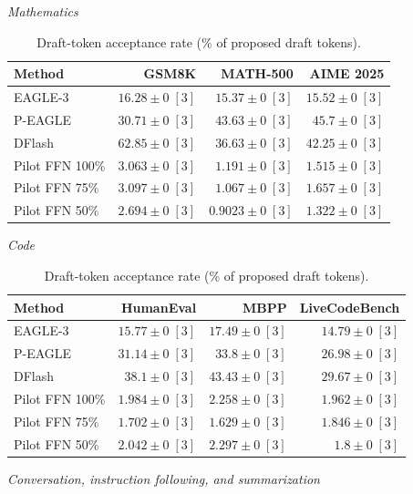 \documentclass[conference,onecolumn]{IEEEtran}
\begin{document}
\begin{table}[!htp]
\centering\small
\setlength{\tabcolsep}{3pt}
\caption{Draft-token acceptance rate (\% of proposed draft tokens).}
\label{tab:appendix-metric-draft-fraction-none}
\textit{Mathematics}\par\smallskip
\begin{tabular}{@{}>{\raggedright\arraybackslash}p{3.7cm}rrr@{}}
\toprule
Method & GSM8K & MATH-500 & AIME 2025 \\
\midrule
EAGLE-3 & \(16.28 \pm 0\;[3]\) & \(15.37 \pm 0\;[3]\) & \(15.52 \pm 0\;[3]\) \\
P-EAGLE & \(30.71 \pm 0\;[3]\) & \(\mathbf{43.63} \pm 0\;[3]\) & \(\mathbf{45.7} \pm 0\;[3]\) \\
DFlash & \(\mathbf{62.85} \pm 0\;[3]\) & \(36.63 \pm 0\;[3]\) & \(42.25 \pm 0\;[3]\) \\
Pilot FFN 100\% & \(3.063 \pm 0\;[3]\) & \(1.191 \pm 0\;[3]\) & \(1.515 \pm 0\;[3]\) \\
Pilot FFN 75\% & \(3.097 \pm 0\;[3]\) & \(1.067 \pm 0\;[3]\) & \(1.657 \pm 0\;[3]\) \\
Pilot FFN 50\% & \(2.694 \pm 0\;[3]\) & \(0.9023 \pm 0\;[3]\) & \(1.322 \pm 0\;[3]\) \\
\bottomrule
\end{tabular}\par\medskip
\textit{Code}\par\smallskip
\begin{tabular}{@{}>{\raggedright\arraybackslash}p{3.7cm}rrr@{}}
\toprule
Method & HumanEval & MBPP & LiveCodeBench \\
\midrule
EAGLE-3 & \(15.77 \pm 0\;[3]\) & \(17.49 \pm 0\;[3]\) & \(14.79 \pm 0\;[3]\) \\
P-EAGLE & \(31.14 \pm 0\;[3]\) & \(33.8 \pm 0\;[3]\) & \(26.98 \pm 0\;[3]\) \\
DFlash & \(\mathbf{38.1} \pm 0\;[3]\) & \(\mathbf{43.43} \pm 0\;[3]\) & \(\mathbf{29.67} \pm 0\;[3]\) \\
Pilot FFN 100\% & \(1.984 \pm 0\;[3]\) & \(2.258 \pm 0\;[3]\) & \(1.962 \pm 0\;[3]\) \\
Pilot FFN 75\% & \(1.702 \pm 0\;[3]\) & \(1.629 \pm 0\;[3]\) & \(1.846 \pm 0\;[3]\) \\
Pilot FFN 50\% & \(2.042 \pm 0\;[3]\) & \(2.297 \pm 0\;[3]\) & \(1.8 \pm 0\;[3]\) \\
\bottomrule
\end{tabular}\par\medskip
\textit{Conversation, instruction following, and summarization}\par\smallskip

\end{table}
\end{document}
